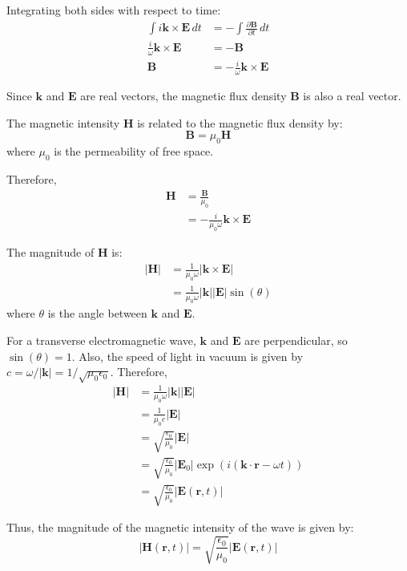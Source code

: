 \documentclass{article}
\begin{document}
Integrating both sides with respect to time:
\begin{align*}
\int i \mathbf{k} \times \mathbf{E}  \, dt &= -\int \frac{\partial \mathbf{B}}{\partial t} \, dt \\
\frac{i}{\omega} \mathbf{k} \times \mathbf{E} &= -\mathbf{B} \\
\mathbf{B} &= -\frac{i}{\omega} \mathbf{k} \times \mathbf{E}
\end{align*}

Since $\mathbf{k}$ and $\mathbf{E}$ are real vectors, the magnetic flux density $\mathbf{B}$ is also a real vector.

The magnetic intensity $\mathbf{H}$ is related to the magnetic flux density by:
\begin{equation*}
\mathbf{B} = \mu_0 \mathbf{H}
\end{equation*}
where $\mu_0$ is the permeability of free space.

Therefore,
\begin{align*}
\mathbf{H} &= \frac{\mathbf{B}}{\mu_0} \\
&= -\frac{i}{\mu_0 \omega} \mathbf{k} \times \mathbf{E}
\end{align*}

The magnitude of $\mathbf{H}$ is:
\begin{align*}
|\mathbf{H}| &= \frac{1}{\mu_0 \omega} |\mathbf{k} \times \mathbf{E}| \\
&= \frac{1}{\mu_0 \omega} |\mathbf{k}| |\mathbf{E}| \sin(\theta)
\end{align*}
where $\theta$ is the angle between $\mathbf{k}$ and $\mathbf{E}$.

For a transverse electromagnetic wave, $\mathbf{k}$ and $\mathbf{E}$ are perpendicular, so $\sin(\theta) = 1$. Also, the speed of light in vacuum is given by $c = \omega/|\mathbf{k}| = 1/\sqrt{\mu_0 \epsilon_0}$. Therefore,
\begin{align*}
|\mathbf{H}| &= \frac{1}{\mu_0 \omega} |\mathbf{k}| |\mathbf{E}| \\
&= \frac{1}{\mu_0 c} |\mathbf{E}| \\
&= \sqrt{\frac{\epsilon_0}{\mu_0}} |\mathbf{E}| \\
&= \sqrt{\frac{\epsilon_0}{\mu_0}} |\mathbf{E}_0| \exp(i (\mathbf{k} \cdot \mathbf{r} - \omega t)) \\
&= \sqrt{\frac{\epsilon_0}{\mu_0}} |\mathbf{E}(\mathbf{r}, t)|
\end{align*}

Thus, the magnitude of the magnetic intensity of the wave is given by:
\begin{equation*}
|\mathbf{H}(\mathbf{r}, t)| = \sqrt{\frac{\epsilon_0}{\mu_0}} |\mathbf{E}(\mathbf{r}, t)|
\end{equation*}
\end{document}
